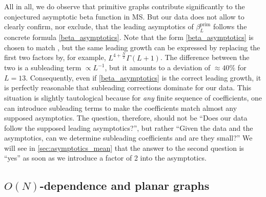 \documentclass[11pt,a4paper]{article}
\renewcommand{\|}{\rule[-0.4ex]{0.2ex}{1.2em}}
\begin{document}
All in all, we do observe that primitive graphs contribute significantly to the conjectured asymptotic beta function in MS. But our data does not allow to clearly confirm, nor exclude, that the leading asymptotics of $\beta^{\text{prim}}_L$ follows the concrete formula \cref{beta_asymptotics}. Note that the form \cref{beta_asymptotics} is chosen to match \cite{mckane_perturbation_2019,kompaniets_minimally_2017}, but the same leading growth can be expressed by replacing the first two factors by, for example, $L^{4+\frac N 2}\Gamma(L+1)$. The difference between the two is a subleading term $\propto L^{-1}$, but it amounts to a deviation of $\approx 40\%$ for $L=13$. Consequently, even if \cref{beta_asymptotics} is the correct leading growth, it is perfectly reasonable that subleading corrections dominate for our data. This situation is slightly tautological because for \emph{any} finite sequence of coefficients, one can introduce subleading terms to make the coefficients match almost any supposed asymptotics. The question, therefore, should not be \enquote{Does our data follow the supposed leading asymptotics?}, but rather \enquote{Given the data and the asymptotics, can we determine subleading coefficients and are they small?} We will see in \cref{sec:asymptotics_mean} that the answer to the second question is \enquote{yes} as soon as we introduce a factor of 2 into the asymptotics.









\subsection[O(N)-dependence and planar graphs]{$O(N)$-dependence and planar graphs}\label{sec:beta_N_dependence}
\end{document}
